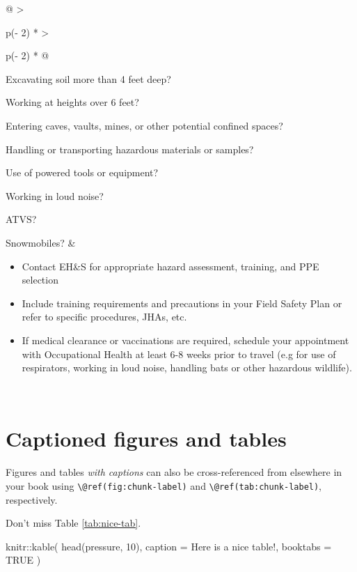 \documentclass[
]{book}
\newenvironment{Shaded}{\begin{snugshade}}{\end{snugshade}}
\newcommand{\AttributeTok}[1]{\textcolor[rgb]{0.77,0.63,0.00}{#1}}
\newcommand{\ConstantTok}[1]{\textcolor[rgb]{0.00,0.00,0.00}{#1}}
\newcommand{\DecValTok}[1]{\textcolor[rgb]{0.00,0.00,0.81}{#1}}
\newcommand{\FunctionTok}[1]{\textcolor[rgb]{0.00,0.00,0.00}{#1}}
\newcommand{\NormalTok}[1]{#1}
\newcommand{\SpecialCharTok}[1]{\textcolor[rgb]{0.00,0.00,0.00}{#1}}
\newcommand{\StringTok}[1]{\textcolor[rgb]{0.31,0.60,0.02}{#1}}
\begin{document}
\begin{longtable}[]{@{}
  >{\raggedright\arraybackslash}p{(\columnwidth - 2\tabcolsep) * }
  >{\raggedright\arraybackslash}p{(\columnwidth - 2\tabcolsep) * }@{}}
Excavating soil more than 4 feet deep?

Working at heights over 6 feet?

Entering caves, vaults, mines, or
other potential confined spaces?

Handling or transporting hazardous
materials or samples?

Use of powered tools or equipment?

Working in loud noise?

ATVS?

Snowmobiles? & \begin{minipage}[t]{\linewidth}\raggedright
\begin{itemize}
\item
  Contact EH\&S for appropriate hazard
  assessment, training, and PPE
  selection
\item
  Include training requirements and
  precautions in your Field Safety Plan
  or refer to specific procedures,
  JHAs, etc.
\item
  If medical clearance or vaccinations
  are required, schedule your
  appointment with Occupational Health
  at least 6-8 weeks prior to travel
  (e.g for use of respirators, working
  in loud noise, handling bats or
  other hazardous wildlife).
\end{itemize}
\end{minipage} \\
\bottomrule
\end{longtable}

\hypertarget{captioned-figures-and-tables}{%
\section{Captioned figures and tables}\label{captioned-figures-and-tables}}

Figures and tables \emph{with captions} can also be cross-referenced from elsewhere in your book using \texttt{\textbackslash{}@ref(fig:chunk-label)} and \texttt{\textbackslash{}@ref(tab:chunk-label)}, respectively.

Don't miss Table \ref{tab:nice-tab}.

\begin{Shaded}
\begin{Highlighting}[]
\NormalTok{knitr}\SpecialCharTok{::}\FunctionTok{kable}\NormalTok{(}
  \FunctionTok{head}\NormalTok{(pressure, }\DecValTok{10}\NormalTok{), }\AttributeTok{caption =} \StringTok{\textquotesingle{}Here is a nice table!\textquotesingle{}}\NormalTok{,}
  \AttributeTok{booktabs =} \ConstantTok{TRUE}
\NormalTok{)}
\end{Highlighting}
\end{Shaded}
\end{document}
